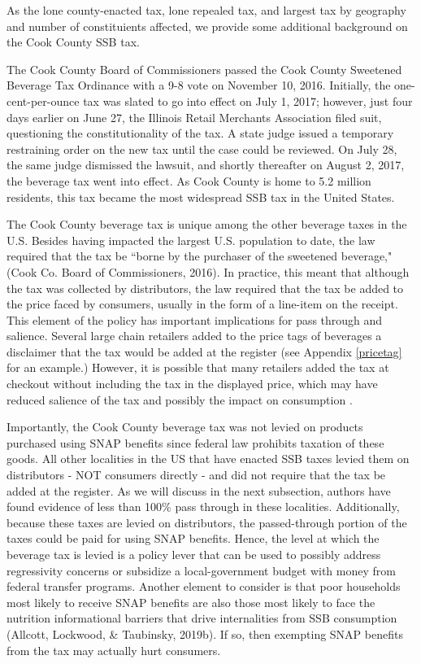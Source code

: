 \documentclass[12pt]{article}
\begin{document}
As the lone county-enacted tax, lone repealed tax, and largest tax by geography and number of constituients affected, we provide some additional background on the Cook County SSB tax.

The Cook County Board of Commissioners passed the Cook County Sweetened Beverage Tax Ordinance with a 9-8 vote on November 10, 2016. Initially, the one-cent-per-ounce tax was slated to go into effect on July 1, 2017; however, just four days earlier on June 27, the Illinois Retail Merchants Association filed suit, questioning the constitutionality of the tax. A state judge issued a temporary restraining order on the new tax until the case could be reviewed. On July 28, the same judge dismissed the lawsuit, and shortly thereafter on August 2, 2017, the beverage tax went into effect. As Cook County is home to 5.2 million residents, this tax became the most widespread SSB tax in the United States.

The Cook County beverage tax is unique among the other beverage taxes in the U.S. Besides having impacted the largest U.S. population to date, the law required that the tax be ``borne by the purchaser of the sweetened beverage," (Cook Co. Board of Commissioners, 2016). In practice, this meant that although the tax was collected by distributors, the law required that the tax be added to the price faced by consumers, usually in the form of a line-item on the receipt. This element of the policy has important implications for pass through and salience. Several large chain retailers added to the price tags of beverages a disclaimer that the tax would be added at the register (see Appendix \ref{pricetag} for an example.) However, it is possible that many retailers added the tax at checkout without including the tax in the displayed price, which may have reduced salience of the tax and possibly the impact on consumption \parencite{chetty2009salience}.

Importantly, the Cook County beverage tax was not levied on products purchased using SNAP benefits since federal law prohibits taxation of these goods. All other localities in the US that have enacted SSB taxes levied them on distributors - NOT consumers directly - and did not require that the tax be added at the register. As we will discuss in the next subsection, authors have found evidence of less than 100\% pass through in these localities. Additionally, because these taxes are levied on distributors, the passed-through portion of the taxes could be paid for using SNAP benefits. Hence, the level at which the beverage tax is levied is a policy lever that can be used to possibly address regressivity concerns or subsidize a local-government budget with money from federal transfer programs. Another element to consider is that poor households most likely to receive SNAP benefits are also those most likely to face the nutrition informational barriers that drive internalities from SSB consumption (Allcott, Lockwood, \& Taubinsky, 2019b). If so, then exempting SNAP benefits from the tax may actually hurt consumers.
\end{document}

